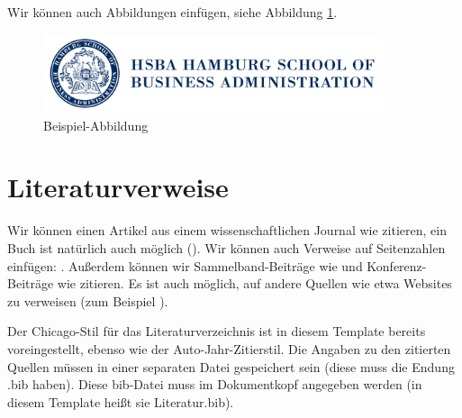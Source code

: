 Wir können auch Abbildungen einfügen, siehe Abbildung \ref{fig:beispielabb}.


\begin{figure}[hbt]
\begin{center}
\includegraphics[width=10cm]{images/hsba.png}   %
\caption{Beispiel-Abbildung} 
\label{fig:beispielabb}
\end{center}
\end{figure}



\section{Literaturverweise}


Wir können einen Artikel aus einem wissenschaftlichen Journal wie \textcite{Glove89} zitieren, ein Buch ist natürlich auch möglich (\cite{Goldb89}). Wir können auch Verweise auf Seitenzahlen einfügen: \textcite[][p. 78]{Goldb89}.
Außerdem können wir Sammelband-Beiträge wie \textcite{Steen01} und Konferenz-Beiträge wie \textcite{Merkl00} zitieren.
Es ist auch möglich, auf andere Quellen wie etwa Websites zu verweisen
(zum Beispiel \cite{HSBA18}).

Der Chicago-Stil für das Literaturverzeichnis ist in diesem Template bereits voreingestellt, ebenso wie der Auto-Jahr-Zitierstil.
Die Angaben zu den zitierten Quellen müssen in einer separaten Datei gespeichert sein (diese muss die Endung .bib haben).
Diese bib-Datei muss im Dokumentkopf angegeben werden (in diesem Template heißt sie Literatur.bib).

